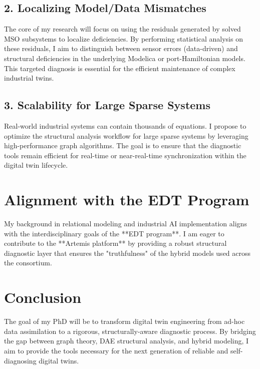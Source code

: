 \documentclass[a4paper,11pt]{article}
\begin{document}
\subsection{2. Localizing Model/Data Mismatches}
The core of my research will focus on using the residuals generated by solved MSO subsystems to localize deficiencies. By performing statistical analysis on these residuals, I aim to distinguish between sensor errors (data-driven) and structural deficiencies in the underlying Modelica or port-Hamiltonian models. This targeted diagnosis is essential for the efficient maintenance of complex industrial twins.

\subsection{3. Scalability for Large Sparse Systems}
Real-world industrial systems can contain thousands of equations. I propose to optimize the structural analysis workflow for large sparse systems by leveraging high-performance graph algorithms. The goal is to ensure that the diagnostic tools remain efficient for real-time or near-real-time synchronization within the digital twin lifecycle.

\section{Alignment with the EDT Program}
My background in relational modeling and industrial AI implementation aligns with the interdisciplinary goals of the **EDT program**. I am eager to contribute to the **Artemis platform** by providing a robust structural diagnostic layer that ensures the "truthfulness" of the hybrid models used across the consortium.

\section{Conclusion}
The goal of my PhD will be to transform digital twin engineering from ad-hoc data assimilation to a rigorous, structurally-aware diagnostic process. By bridging the gap between graph theory, DAE structural analysis, and hybrid modeling, I aim to provide the tools necessary for the next generation of reliable and self-diagnosing digital twins.
\end{document}
